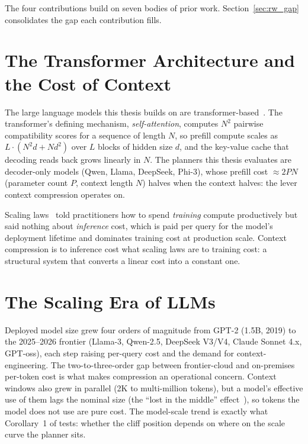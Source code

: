 The four contributions build on seven bodies of prior work. Section~\ref{sec:rw_gap} consolidates the gap each contribution fills.

\section{The Transformer Architecture and the Cost of Context}
\label{sec:rw_transformer}

The large language models this thesis builds on are transformer-based~\cite{vaswani2017attention}. The transformer's defining
mechanism, \emph{self-attention}, computes $N^2$ pairwise
compatibility scores
for a sequence of length $N$, so prefill compute scales as
$L\cdot(N^2 d + N d^2)$ over $L$ blocks of hidden size $d$, and the
key-value cache that decoding reads back grows linearly in $N$. The
planners this thesis evaluates are decoder-only models (Qwen, Llama,
DeepSeek, Phi-3), whose prefill cost $\approx 2PN$ (parameter count
$P$, context length $N$) halves when the context halves: the lever
context compression operates on.

Scaling laws~\cite{kaplan2020scalinglaws, hoffmann2022chinchilla}
told practitioners how to spend \emph{training} compute productively
but said nothing about \emph{inference} cost, which is paid per
query for the model's deployment lifetime and dominates training
cost at production scale. Context compression is to
inference cost what scaling laws are to training cost: a structural
system that converts a linear cost into a constant one.

\section{The Scaling Era of LLMs}
\label{sec:rw_scaling}

Deployed model size grew four orders of magnitude from GPT-2
(1.5B, 2019) to the 2025--2026 frontier (Llama-3, Qwen-2.5,
DeepSeek V3/V4, Claude Sonnet 4.x, GPT-oss), each step raising
per-query cost and the demand for context-engineering. The two-to-three-order gap between frontier-cloud and
on-premises per-token cost is what makes compression an operational
concern. Context windows also grew in parallel (2K to multi-million
tokens), but a model's effective use of them lags the nominal
size (the ``lost in the middle'' effect~\cite{liu2024lostinmiddle,
hsieh2024ruler}), so tokens the model does not use are pure
cost. The model-scale trend is exactly what Corollary~1 of
 tests: whether the cliff position depends on
where on the scale curve the planner sits.

